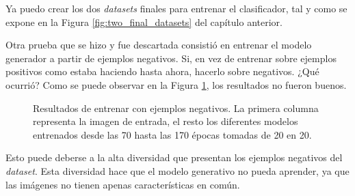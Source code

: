 Ya puedo crear los dos \textit{datasets} finales para entrenar el clasificador, tal y como se expone en la Figura \ref{fig:two_final_datasets} del capítulo anterior.

\newpage
Otra prueba que se hizo y fue descartada consistió en entrenar el modelo generador a partir de ejemplos negativos. Si, en vez de entrenar sobre ejemplos positivos como estaba haciendo hasta ahora, hacerlo sobre negativos. ¿Qué ocurrió? Como se puede observar en la Figura \ref{fig:extraepochs}, los resultados no fueron buenos.

\begin{figure}[H]
\centering
    \caption{Resultados de entrenar con ejemplos negativos. La primera columna representa la imagen de entrada, el resto los diferentes modelos entrenados desde las 70 hasta las 170 épocas tomadas de 20 en 20.}
    \label{fig:extraepochs}
\end{figure}

Esto puede deberse a la alta diversidad que presentan los ejemplos negativos del \textit{dataset}. Esta diversidad hace que el modelo generativo no pueda aprender, ya que las imágenes no tienen apenas características en común.

